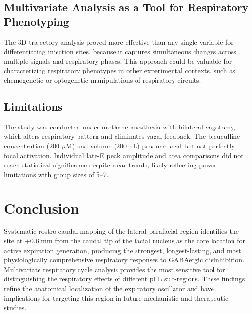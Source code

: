 \documentclass[12pt]{article}
\begin{document}
\subsection{Multivariate Analysis as a Tool for Respiratory Phenotyping}

The 3D trajectory analysis proved more effective than any single variable for differentiating injection sites, because it captures simultaneous changes across multiple signals and respiratory phases. This approach could be valuable for characterizing respiratory phenotypes in other experimental contexts, such as chemogenetic or optogenetic manipulations of respiratory circuits.

\subsection{Limitations}

The study was conducted under urethane anesthesia with bilateral vagotomy, which alters respiratory pattern and eliminates vagal feedback. The bicuculline concentration (200 $\mu$M) and volume (200 nL) produce local but not perfectly focal activation. Individual late-E peak amplitude and area comparisons did not reach statistical significance despite clear trends, likely reflecting power limitations with group sizes of 5--7.

\section{Conclusion}

Systematic rostro-caudal mapping of the lateral parafacial region identifies the site at $+0.6$ mm from the caudal tip of the facial nucleus as the core location for active expiration generation, producing the strongest, longest-lasting, and most physiologically comprehensive respiratory responses to GABAergic disinhibition. Multivariate respiratory cycle analysis provides the most sensitive tool for distinguishing the respiratory effects of different pFL sub-regions. These findings refine the anatomical localization of the expiratory oscillator and have implications for targeting this region in future mechanistic and therapeutic studies.



\end{document}
